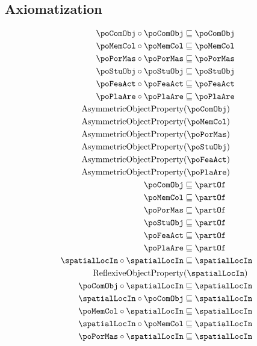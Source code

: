 \subsection{Axiomatization}
\label{axs:Partonymy}
\begin{align}
\poComObj \circ \poComObj &\sqsubseteq \poComObj \label{ax:trans1}\\
\poMemCol \circ \poMemCol &\sqsubseteq \poMemCol \\
\poPorMas \circ \poPorMas &\sqsubseteq \poPorMas \\
\poStuObj \circ \poStuObj &\sqsubseteq \poStuObj \\
\poFeaAct \circ \poFeaAct &\sqsubseteq \poFeaAct \\
\poPlaAre \circ \poPlaAre &\sqsubseteq \poPlaAre \label{ax:trans6}\\
\text{AsymmetricObjectProperty}&(\poComObj) \label{ax:asym1}\\
\text{AsymmetricObjectProperty}&(\poMemCol)\\
\text{AsymmetricObjectProperty}&(\poPorMas)\\
\text{AsymmetricObjectProperty}&(\poStuObj)\\
\text{AsymmetricObjectProperty}&(\poFeaAct)\\
\text{AsymmetricObjectProperty}&(\poPlaAre) \label{ax:asym6}\\
\poComObj &\sqsubseteq \partOf \label{ax:subpof1}\\
\poMemCol &\sqsubseteq \partOf\\
\poPorMas &\sqsubseteq \partOf\\
\poStuObj &\sqsubseteq \partOf\\
\poFeaAct &\sqsubseteq \partOf\\
\poPlaAre &\sqsubseteq \partOf \label{ax:subpof6}\\
\spatialLocIn \circ \spatialLocIn &\sqsubseteq \spatialLocIn \label{ax:transloc}\\
\text{ReflexiveObjectProperty}&(\spatialLocIn)\\
\poComObj\circ\spatialLocIn&\sqsubseteq \spatialLocIn \label{ax:spatial1}\\
\spatialLocIn\circ \poComObj&\sqsubseteq\spatialLocIn\\
\poMemCol\circ\spatialLocIn&\sqsubseteq \spatialLocIn\\
\spatialLocIn\circ \poMemCol&\sqsubseteq\spatialLocIn\\
\poPorMas\circ\spatialLocIn&\sqsubseteq \spatialLocIn\\

\end{align}
